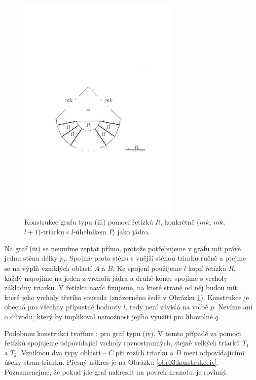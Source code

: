 \begin{figure}[h]\centering
\includegraphics[width = 80mm]{../img/iii-construction}
\caption{Konstrukce grafu typu (iii) pomocí řetízků $R$, konkrétně ($mk$, $mk$, $l+1$)-triarku s $l$-úhelníkem $P_l$ jako jádro.}
\label{obr03:konstrukceiii}
\end{figure}

Na graf (iii) se neumíme zeptat přímo, protože potřebujeme v grafu mít právě jednu stěnu délky $p_l$. Spojme proto stěnu s vnější stěnou triarku ručně a ptejme se na výplň vzniklých oblastí $A$ a $B$. Ke spojení použijeme $l$ kopií řetízku $R$, každý napojíme na jeden z vrcholů jádra a druhé konce spojíme s  vrcholy základny triarku. V řetízku navíc fixujeme, na které straně od něj budou mít které jeho vrcholy třetího souseda (znázorněno šedě v Obrázku \ref{obr03:konstrukceiii}). Konstrukce je obecná pro všechny přípustné hodnoty $l$, tedy není závislá na volbě $p$. Nevíme ani o důvodu, který by implikoval nemožnost jejího využití pro libovolné $q$.


Podobnou konstrukci tvoříme i pro graf typu (iv). V tomto případě za pomoci řetízků spojujeme odpovídající vrcholy rovnostranných, stejně velkých triarků $T_1$ a $T_2$. Vzniknou dva typy oblastí -- $C$ při rozích triarku a $D$ mezi odpovídajícími úseky stran triarků. Přesný nákres je na Obrázku \ref{obr03:konstrukceiv}. Poznamenejme, že pokud jde graf nakreslit na povrch hranolu, je rovinný. 


